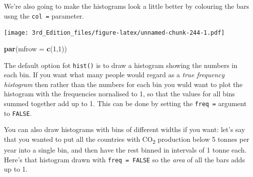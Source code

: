 \documentclass[
]{book}
\newenvironment{Shaded}{\begin{snugshade}}{\end{snugshade}}
\newcommand{\DataTypeTok}[1]{\textcolor[rgb]{0.13,0.29,0.53}{#1}}
\newcommand{\DecValTok}[1]{\textcolor[rgb]{0.00,0.00,0.81}{#1}}
\newcommand{\KeywordTok}[1]{\textcolor[rgb]{0.13,0.29,0.53}{\textbf{#1}}}
\newcommand{\NormalTok}[1]{#1}
\newcommand{\OperatorTok}[1]{\textcolor[rgb]{0.81,0.36,0.00}{\textbf{#1}}}
\newcommand{\StringTok}[1]{\textcolor[rgb]{0.31,0.60,0.02}{#1}}
\begin{document}
We're also going to make the histograms look a little better by colouring the bars usng the \texttt{col\ =} parameter.

\begin{Shaded}
\end{Shaded}

\texttt{[image: 3rd\_Edition\_files/figure-latex/unnamed-chunk-244-1.pdf]}

\begin{Shaded}
\begin{Highlighting}[]

\KeywordTok{par}\NormalTok{(}\DataTypeTok{mfrow =} \KeywordTok{c}\NormalTok{(}\DecValTok{1}\NormalTok{,}\DecValTok{1}\NormalTok{))}
\end{Highlighting}
\end{Shaded}

The default option fot \texttt{hist()} is to draw a histogram showing the numbers in each bin. If you want what many people would regard as a \emph{true frequency histogram} then rather than the numbers for each bin you wuld want to plot the histogram with the frequencies nornalised to 1, so that the values for all bins summed together add up to 1. This can be done by setting the \texttt{freq\ =} argument to \texttt{FALSE}.

You can also draw histograms with bins of different widths if you want: let's say that you wanted to put all the countries with CO\textsubscript{2} production below 5 tonnes per year into a single bin, and then have the rest binned in intervals of 1 tonne each. Here's that histogram drawn with \texttt{freq\ =\ FALSE} so the \emph{area} of all the bars adds up to 1.
\end{document}
